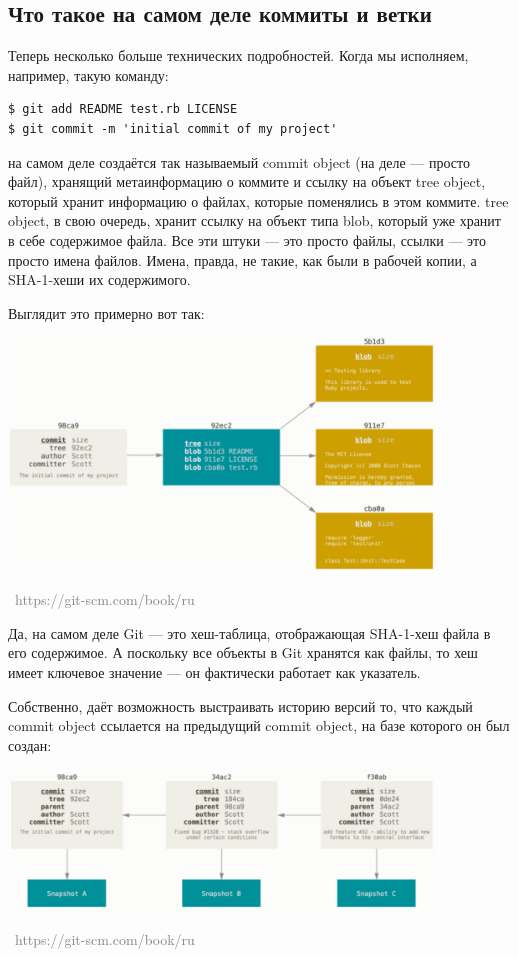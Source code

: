 \documentclass[a5paper]{article}
\newcommand{\attribution}[1] {
\vspace{-5mm}\begin{flushright}\begin{scriptsize}\textcolor{gray}{\textcopyright\, #1}\end{scriptsize}\end{flushright}
}
\begin{document}
\subsection{Что такое на самом деле коммиты и ветки}

Теперь несколько больше технических подробностей. Когда мы исполняем, например, такую команду:

\begin{verbatim}
$ git add README test.rb LICENSE
$ git commit -m 'initial commit of my project'
\end{verbatim}

на самом деле создаётся так называемый commit object (на деле --- просто файл), хранящий метаинформацию о коммите и ссылку на объект tree object, который хранит информацию о файлах, которые поменялись в этом коммите. tree object, в свою очередь, хранит ссылку на объект типа blob, который уже хранит в себе содержимое файла. Все эти штуки --- это просто файлы, ссылки --- это просто имена файлов. Имена, правда, не такие, как были в рабочей копии, а SHA-1-хеши их содержимого.

Выглядит это примерно вот так:

\begin{center}
	\includegraphics[width=0.85\textwidth]{blobs.png}
	\attribution{https://git-scm.com/book/ru}
\end{center}

Да, на самом деле Git --- это хеш-таблица, отображающая SHA-1-хеш файла в его содержимое. А поскольку все объекты в Git хранятся как файлы, то хеш имеет ключевое значение --- он фактически работает как указатель.

Собственно, даёт возможность выстраивать историю версий то, что каждый commit object ссылается на предыдущий commit object, на базе которого он был создан:

\begin{center}
	\includegraphics[width=0.85\textwidth]{commits.png}
	\attribution{https://git-scm.com/book/ru}
\end{center}
\end{document}
